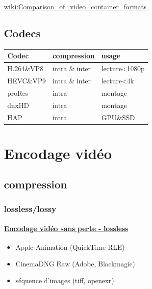 \documentclass[
]{book}
\providecommand{\tightlist}{%
  \setlength{\itemsep}{0pt}\setlength{\parskip}{0pt}}
\begin{document}
\href{https://en.wikipedia.org/wiki/Comparison_of_video_container_formats}{wiki:Comparison\_of\_video\_container\_formats}

\hypertarget{codecs}{%
\subsection{Codecs}\label{codecs}}

\begin{longtable}[]{@{}lll@{}}
\toprule
Codec & compression & usage\tabularnewline
\midrule
\endhead
H.264\&VP8 & intra \& inter & lecture\textless1080p\tabularnewline
HEVC\&VP9 & intra \& inter & lecture\textless4k\tabularnewline
proRes & intra & montage\tabularnewline
dnxHD & intra & montage\tabularnewline
HAP & intra & GPU\&SSD\tabularnewline
\bottomrule
\end{longtable}

\hypertarget{lexique_encodage}{%
\section{Encodage vidéo}\label{lexique_encodage}}

\hypertarget{compression}{%
\subsection{compression}\label{compression}}

\hypertarget{losslesslossy}{%
\subsubsection{lossless/lossy}\label{losslesslossy}}

\hypertarget{encodage-viduxe9o-sans-perte---lossless}{%
\paragraph{\texorpdfstring{\href{https://en.wikipedia.org/wiki/List_of_codecs\#Lossless_video_compression}{Encodage vidéo sans perte - lossless}}{Encodage vidéo sans perte - lossless}}\label{encodage-viduxe9o-sans-perte---lossless}}

\begin{itemize}
\tightlist
\item
  Apple Animation (QuickTime RLE)
\item
  CinemaDNG Raw (Adobe, Blackmagic)
\item
  séquence d'images (tiff, openexr)
\end{itemize}
\end{document}
